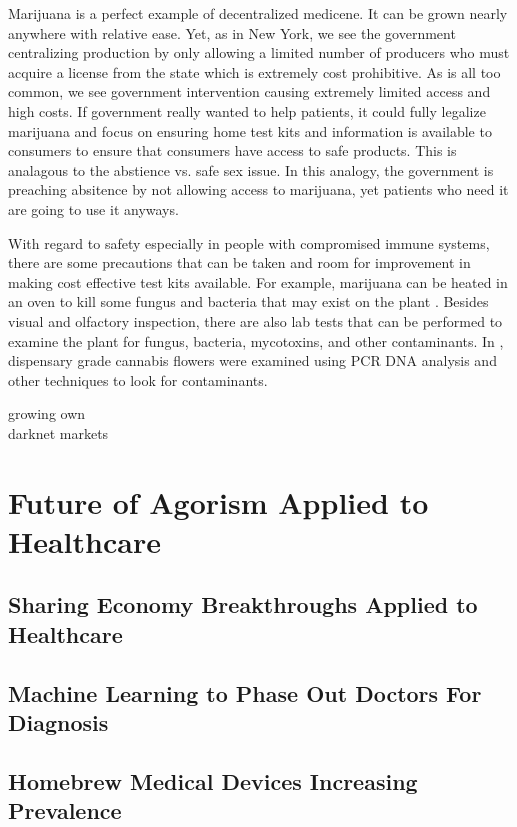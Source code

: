 \documentclass{article}
\begin{document}
Marijuana is a perfect example of decentralized medicene. It can be grown nearly anywhere with relative ease. Yet, as in New York, we see the government centralizing production by only allowing a limited number of producers who must acquire a license from the state which is extremely cost prohibitive. As is all too common, we see government intervention causing extremely limited access and high costs. If government really wanted to help patients, it could fully legalize marijuana and focus on ensuring home test kits and information is available to consumers to ensure that consumers have access to safe products. This is analagous to the abstience vs. safe sex issue. In this analogy, the government is preaching absitence by not allowing access to marijuana, yet patients who need it are going to use it anyways.

With regard to safety especially in people with compromised immune systems, there are some precautions that can be taken and room for improvement in making cost effective test kits available. For example, marijuana can be heated in an oven to kill some fungus and bacteria that may exist on the plant \cite{russo2014handbook}. Besides visual and olfactory inspection, there are also lab tests that can be performed to examine the plant for fungus, bacteria, mycotoxins, and other contaminants. In \cite{mckernan2015cannabis}, dispensary grade cannabis flowers were examined using PCR DNA analysis and other techniques to look for contaminants. 

growing own\\
darknet markets\\


\section{Future of Agorism Applied to Healthcare}

\subsection{Sharing Economy Breakthroughs Applied to Healthcare}


\subsection{Machine Learning to Phase Out Doctors For Diagnosis}

\subsection{Homebrew Medical Devices Increasing Prevalence}
\end{document}
